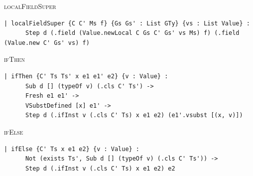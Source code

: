 \begin{cmp}{\textsc{localFieldSuper}}
\begin{paperside}
\end{paperside}
\begin{leanside}
\begin{lstlisting}[style=leanside]
  | localFieldSuper {C C' Ms f} {Gs Gs' : List GTy} {vs : List Value} :
      Step d (.field (Value.newLocal C Gs C' Gs' vs Ms) f) (.field (Value.new C' Gs' vs) f)
\end{lstlisting}
\end{leanside}
\nomapping
\end{cmp}

\begin{cmp}{\textsc{ifThen}}
\begin{paperside}
\end{paperside}
\begin{leanside}
\begin{lstlisting}[style=leanside]
  | ifThen {C' Ts Ts' x e1 e1' e2} {v : Value} :
      Sub d [] (typeOf v) (.cls C' Ts') ->
      Fresh e1 e1' ->
      VSubstDefined [x] e1' ->
      Step d (.ifInst v (.cls C' Ts) x e1 e2) (e1'.vsubst [(x, v)])
\end{lstlisting}
\end{leanside}
\end{cmp}

\begin{cmp}{\textsc{ifElse}}
\begin{paperside}
\end{paperside}
\begin{leanside}
\begin{lstlisting}[style=leanside]
  | ifElse {C' Ts x e1 e2} {v : Value} :
      Not (exists Ts', Sub d [] (typeOf v) (.cls C' Ts')) ->
      Step d (.ifInst v (.cls C' Ts) x e1 e2) e2
\end{lstlisting}
\end{leanside}
\nomapping
\end{cmp}

